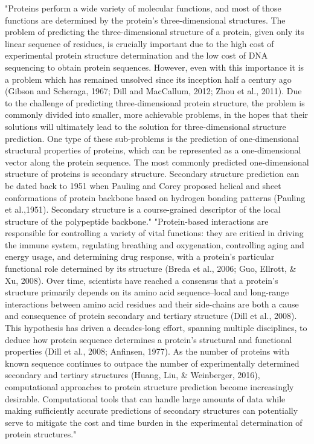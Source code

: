 "Proteins perform a wide variety of molecular functions, and most of those functions are determined by the protein’s three-dimensional structures. The problem of predicting the three-dimensional structure of a protein, given only its linear sequence of residues, is crucially important due to the high cost of experimental protein structure determination and the low cost of DNA sequencing to obtain protein sequences. However, even with this importance it is a problem which has remained unsolved since its inception half a century ago (Gibson and Scheraga, 1967; Dill and MacCallum, 2012; Zhou et al., 2011). Due to the challenge of predicting three-dimensional protein structure, the problem is commonly divided into smaller, more achievable problems, in the hopes that their solutions will ultimately lead to the solution for three-dimensional structure prediction. One type of these sub-problems is the prediction of one-dimensional structural properties of proteins, which can be represented as a one-dimensional vector along the protein sequence. The most commonly predicted one-dimensional structure of proteins is secondary structure. Secondary structure prediction can be dated back to 1951 when Pauling and Corey proposed helical and sheet conformations of protein backbone based on hydrogen bonding patterns (Pauling et al.,1951). Secondary structure is a course-grained descriptor of the local structure of the polypeptide backbone." \cite{Heffernan2017}
"Protein-based interactions are responsible for controlling a variety of vital functions: they are critical in driving the immune system, regulating breathing and oxygenation, controlling aging and energy usage, and determining drug response, with a protein’s particular functional role determined by its structure (Breda et al., 2006; Guo, Ellrott, \& Xu, 2008). Over time, scientists have reached a consensus that a protein’s structure primarily depends on its amino acid sequence–local and long-range interactions between amino acid residues and their side-chains are both a cause and consequence of protein secondary and tertiary structure (Dill et al., 2008). This hypothesis has driven a decades-long effort, spanning multiple disciplines, to deduce how protein sequence determines a protein’s structural and functional properties (Dill et al., 2008; Anfinsen, 1977).
As the number of proteins with known sequence continues to outpace the number of experimentally determined secondary and tertiary structures (Huang, Liu, \& Weinberger, 2016), computational approaches to protein structure prediction become increasingly desirable. Computational tools that can handle large amounts of data while making sufficiently accurate predictions of secondary structures can potentially serve to mitigate the cost and time burden in the experimental determination of protein structures." \cite{Busia2017}

